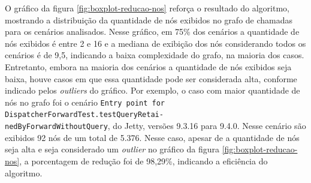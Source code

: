 O gráfico da figura \ref{fig:boxplot-reducao-nos} reforça o resultado do algoritmo, mostrando a distribuição da quantidade de nós exibidos no grafo de chamadas para os cenários analisados. Nesse gráfico, em 75\% dos cenários a quantidade de nós exibidos é entre 2 e 16 e a mediana de exibição dos nós considerando todos os cenários é de 9,5, indicando a baixa complexidade do grafo, na maioria dos casos. Entretanto, embora na maioria dos cenários a quantidade de nós exibidos seja baixa, houve casos em que essa quantidade pode ser considerada alta, conforme indicado pelos \textit{outliers} do gráfico. Por exemplo, o caso com maior quantidade de nós no grafo foi o cenário \texttt{Entry point for DispatcherForwardTest.testQueryRetai-\\nedByForwardWithoutQuery}, do Jetty, versões 9.3.16 para 9.4.0. Nesse cenário são exibidos 92 nós de um total de 5.376. Nesse caso, apesar de a quantidade de nós seja alta e seja considerado um \textit{outlier} no gráfico da figura \ref{fig:boxplot-reducao-nos}, a porcentagem de redução foi de 98,29\%, indicando a eficiência do algoritmo.

